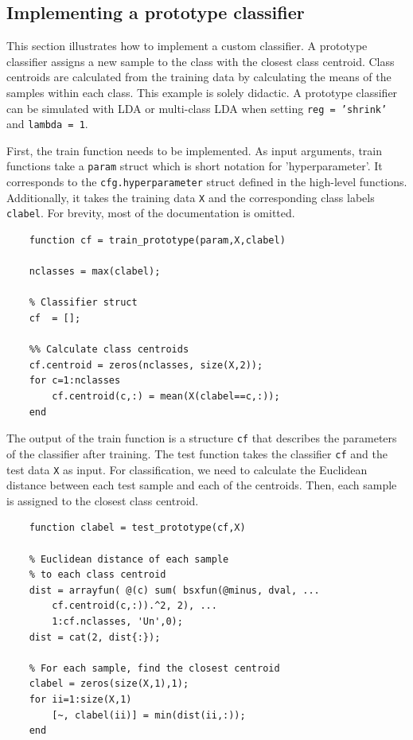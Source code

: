 \documentclass[utf8]{frontiersSCNS} %
\newcommand{\ttt}[1]{\texttt{#1}}
\begin{document}
\subsection{Implementing a prototype classifier}

This section illustrates how to implement a custom classifier. A prototype classifier assigns a new sample to the class with the closest class centroid. Class centroids are calculated from the training data by calculating the means of the samples within each class. This example is solely didactic. A prototype classifier can be simulated with LDA or multi-class LDA when setting \ttt{reg = 'shrink'} and \ttt{lambda = 1}.

First, the train function needs to be implemented. As input arguments, train functions take a \ttt{param} struct which is short notation for 'hyperparameter'. It corresponds to the \ttt{cfg.hyperparameter} struct defined in the high-level functions. Additionally, it takes the training data \ttt{X} and the corresponding class labels \ttt{clabel}. For brevity, most of the documentation is omitted.

\begin{verbatim}
    function cf = train_prototype(param,X,clabel)

    nclasses = max(clabel);

    % Classifier struct
    cf  = [];

    %% Calculate class centroids
    cf.centroid = zeros(nclasses, size(X,2));
    for c=1:nclasses
        cf.centroid(c,:) = mean(X(clabel==c,:));
    end
\end{verbatim}

The output of the train function is a structure \ttt{cf} that describes the parameters of the classifier after training. The test function takes the classifier \ttt{cf} and the test data \ttt{X} as input. For classification, we need to calculate the Euclidean distance between each test sample and each of the centroids. Then, each sample is assigned to the closest class centroid.

\begin{verbatim}
    function clabel = test_prototype(cf,X)

    % Euclidean distance of each sample 
    % to each class centroid
    dist = arrayfun( @(c) sum( bsxfun(@minus, dval, ...
        cf.centroid(c,:)).^2, 2), ...
        1:cf.nclasses, 'Un',0);
    dist = cat(2, dist{:});

    % For each sample, find the closest centroid
    clabel = zeros(size(X,1),1);
    for ii=1:size(X,1)
        [~, clabel(ii)] = min(dist(ii,:));
    end

\end{verbatim}
\end{document}
